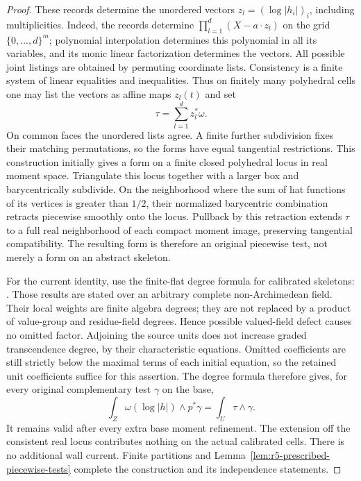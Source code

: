 \documentclass[11pt,a4paper]{article}
\numberwithin{equation}{section}
\theoremstyle{definition}
\theoremstyle{remark}
\begin{document}
\begin{proof}
These records determine the unordered vectors
$z_l=(\log|h_i|)_i$, including multiplicities. Indeed, the records
determine
$\prod_{l=1}^d(X-a\cdot z_l)$ on the grid
$\{0,\ldots,d\}^m$; polynomial interpolation determines this
polynomial in all its variables, and its monic linear factorization
determines the vectors. All possible joint listings are obtained by
permuting coordinate lists. Consistency is a finite system of linear
equalities and inequalities. Thus on finitely many polyhedral cells
one may list the vectors as affine maps $z_l(t)$ and set
\[
 \tau=\sum_{l=1}^d z_l^*\omega.
\]
On common faces the unordered lists agree. A finite further
subdivision fixes their matching permutations, so the forms have
equal tangential restrictions. This construction initially gives a
form on a finite closed polyhedral locus in real moment space.
Triangulate this locus together with a larger box and barycentrically
subdivide. On the neighborhood where the sum of hat functions of
its vertices is greater than $1/2$, their normalized barycentric
combination retracts piecewise smoothly onto the locus. Pullback
by this retraction extends $\tau$ to a full real neighborhood of
each compact moment image, preserving tangential compatibility.
The resulting form is therefore an original piecewise test, not
merely a form on an abstract skeleton.

For the current identity, use the finite-flat degree formula for
calibrated skeletons: \cite[Lemma~3.15 and Proposition~3.19,
especially equation~(3.20)]{Mih24}. Those results are
stated over an arbitrary complete non-Archimedean field. Their
local weights are finite algebra degrees; they are not replaced
by a product of value-group and residue-field degrees. Hence
possible valued-field defect causes no omitted factor. Adjoining
the source units does not increase graded transcendence degree,
by their characteristic equations. Omitted coefficients are still
strictly below the maximal terms of each initial equation, so the
retained unit coefficients suffice for this assertion. The degree
formula therefore gives, for every original complementary test
$\gamma$ on the base,
\[
 \int_Z\omega(\log|h|)\wedge p^*\gamma
      =\int_U\tau\wedge\gamma.
\]
It remains valid after every extra base moment refinement. The
extension off the consistent real locus contributes nothing on
the actual calibrated cells. There is no additional wall current.
Finite partitions and Lemma~\ref{lem:r5-prescribed-piecewise-tests}
complete the construction and its independence statements.
\end{proof}
\end{document}
